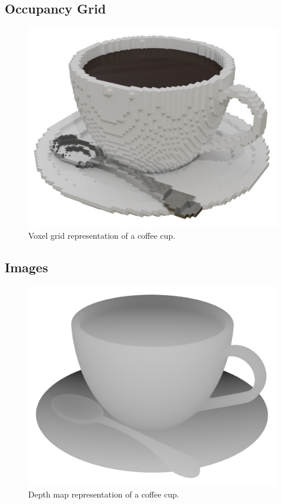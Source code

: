 \subsection{Occupancy Grid}
\label{subsec:occupancy_grid}

\begin{figure}[h]
	\centering
	\includegraphics[scale=0.2]{Images/Voxel Cup}
	\caption{Voxel grid representation of a coffee cup.}
	\label{fig:voxel_cup}
\end{figure}

\subsection{Images}

\begin{figure}[h]
	\centering
	\includegraphics[scale=0.2]{Images/Depth Map Cup}
	\caption{Depth map representation of a coffee cup.}
	\label{fig:depth_map_cup}
\end{figure}

